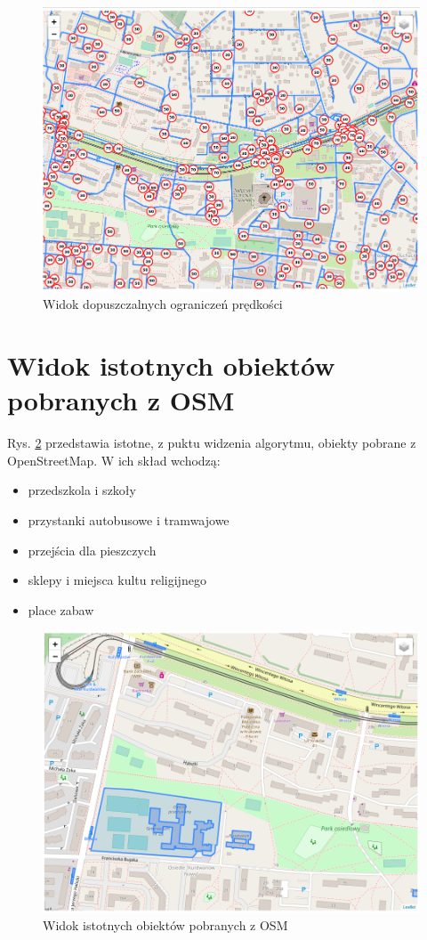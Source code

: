 \begin{figure}[h]
\caption{Widok dopuszczalnych ograniczeń prędkości}
\label{sec:speedLimitMap}
\centering
\includegraphics[width=1.03\textwidth]{speedLimit}
\end{figure}

\newpage
\section{Widok istotnych obiektów pobranych z OSM}
\label{sec:objects}

Rys. \ref{sec:objectsMap} przedstawia istotne, z puktu widzenia algorytmu, obiekty pobrane z OpenStreetMap. W ich skład wchodzą:
\begin{itemize}
\item przedszkola i szkoły
\item przystanki autobusowe i tramwajowe
\item przejścia dla pieszczych
\item sklepy i miejsca kultu religijnego
\item place zabaw
\end{itemize}

\begin{figure}[h]
\caption{Widok istotnych obiektów pobranych z OSM}
\label{sec:objectsMap}
\centering
\includegraphics[width=1.03\textwidth]{objects}
\end{figure}

